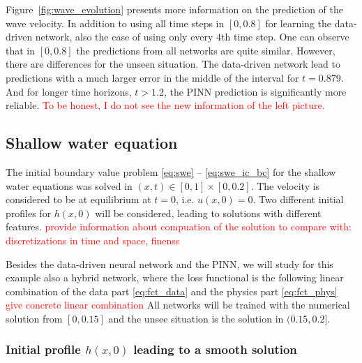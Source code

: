 Figure~\ref{fig:wave_evolution} presents more information on the prediction of the wave velocity. 
In addition to using all time steps in $[0,0.8]$ for learning the data-driven network, also the 
case of using only every $4$th time step. One can observe that in $[0,0.8]$ the predictions 
from all networks are quite similar. However, there are differences for the unseen situation.
The data-driven network lead to predictions with a much larger error in the middle of the interval for $t=0.879$. And for longer time horizons, $t>1.2$, the PINN prediction is significantly more reliable.
\textcolor{red}{To be honest, I do not see the new information of the left picture.}


\subsection{Shallow water equation}

The initial boundary value problem \eqref{eq:swe} -- \eqref{eq:swe_ic_bc} for the shallow water 
equations was solved in $(x,t) \in [0,1]\times [0,0.2]$. The velocity is considered to be at equilibrium at $t=0$, i.e. $u(x, 0) = 0$.
Two different initial profiles for 
$h(x,0)$ will be considered, leading to solutions with different features.
\textcolor{red}{provide 
information about compuation of the solution to compare with: discretizations in time and space, 
finenss}

Besides the data-driven neural network and the PINN, we will study for this example also a hybrid network, where the loss functional is the following linear combination of the data part \eqref{eq:fct_data} and the physics part \eqref{eq:fct_phys} \textcolor{red}{give concrete linear combination}
All networks will be trained with the numerical solution from $[0,0.15]$ and the unsee situation 
is the solution in $(0.15,0.2]$. 


  
\subsubsection{Initial profile $h(x, 0)$ leading to a smooth solution}

